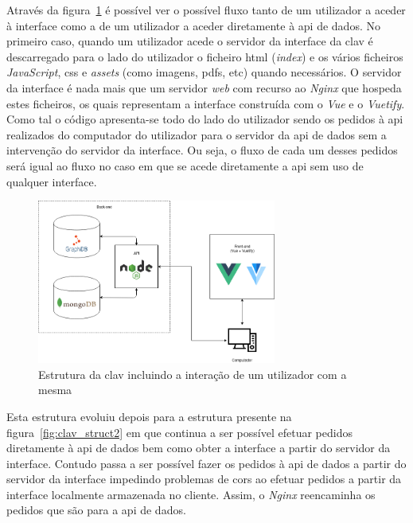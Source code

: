 Através da figura~\ref{fig:clav_struct} é possível ver o possível fluxo tanto de um utilizador a aceder à interface como a de um utilizador a aceder diretamente à \acrshort{api} de dados. No primeiro caso, quando um utilizador acede o servidor da interface da \acrshort{clav} é descarregado para o lado do utilizador o ficheiro \acrshort{html} (\textit{index}) e os vários ficheiros \textit{JavaScript}, \acrshort{css} e \textit{assets} (como imagens, \acrshort{pdf}s, etc) quando necessários. O servidor da interface é nada mais que um servidor \textit{web} com recurso ao \textit{Nginx} que hospeda estes ficheiros, os quais representam a interface construída com o \textit{Vue} e o \textit{Vuetify}. Como tal o código apresenta-se todo do lado do utilizador sendo os pedidos à \acrshort{api} realizados do computador do utilizador para o servidor da \acrshort{api} de dados sem a intervenção do servidor da interface. Ou seja, o fluxo de cada um desses pedidos será igual ao fluxo no caso em que se acede diretamente a \acrshort{api} sem uso de qualquer interface.

\begin{figure}[H]
    \centering
    \includegraphics[width=0.7\textwidth]{img/clav_struct.png}
    \caption{Estrutura da \acrshort{clav} incluindo a interação de um utilizador com a mesma}\label{fig:clav_struct}
\end{figure}

Esta estrutura evoluiu depois para a estrutura presente na figura~\ref{fig:clav_struct2} em que continua a ser possível efetuar pedidos diretamente à \acrshort{api} de dados bem como obter a interface a partir do servidor da interface. Contudo passa a ser possível fazer os pedidos à \acrshort{api} de dados a partir do servidor da interface impedindo problemas de \acrshort{cors} ao efetuar pedidos a partir da interface localmente armazenada no cliente. Assim, o \textit{Nginx} reencaminha os pedidos que são para a \acrshort{api} de dados.

